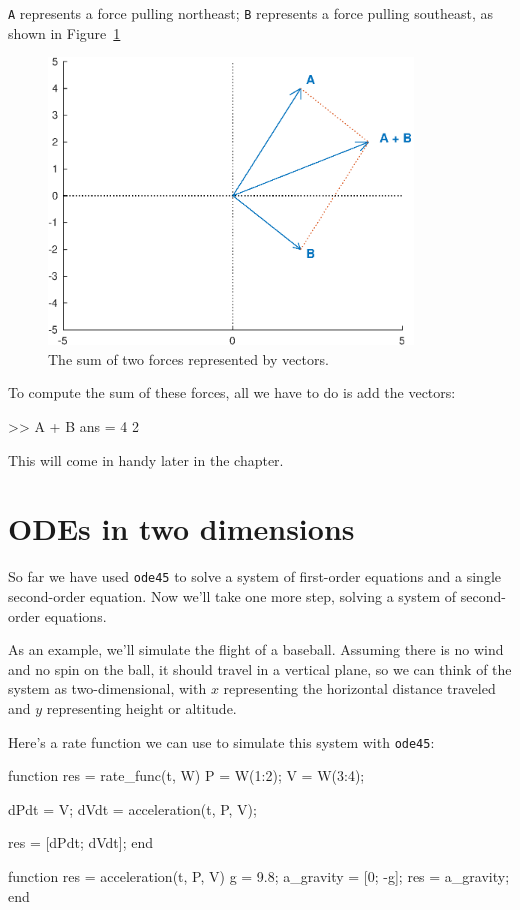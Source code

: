 \documentclass[
]{book}
\numberwithin{Answer}{chapter}
\numberwithin{Exercise}{chapter}
\begin{document}
{\tt A} represents a force pulling northeast; {\tt B} represents a force pulling southeast, as shown in Figure~\ref{fig:vector2}

\begin{figure}
\centerline{\includegraphics[height=3in]{book/figs/vector2.eps}}
\caption{The sum of two forces represented by vectors.}
\label{fig:vector2}
\end{figure}

To compute the sum of these forces, all we have to do is add the vectors:

\begin{code}
>> A + B
ans = 4     2
\end{code}

This will come in handy later in the chapter.


\section{ODEs in two dimensions}
\label{sect:projectile}

So far we have used {\tt ode45} to solve a system of first-order equations and a single second-order equation.  Now we'll take one more step, solving a system of second-order equations.

As an example, we'll simulate the flight of a baseball.
Assuming there is no wind and no spin on the ball, it should travel in a vertical plane, so we can think of the system as
two-dimensional, with $x$ representing the horizontal distance
traveled and $y$ representing height or altitude.


Here's a rate function we can use to simulate this system with {\tt ode45}:

\begin{code}
function res = rate_func(t, W)
    P = W(1:2);
    V = W(3:4);

    dPdt = V;
    dVdt = acceleration(t, P, V);

    res = [dPdt; dVdt];
end

function res = acceleration(t, P, V)
    g = 9.8;             %
    a_gravity = [0; -g];
    res = a_gravity;
end
\end{code}
\end{document}
